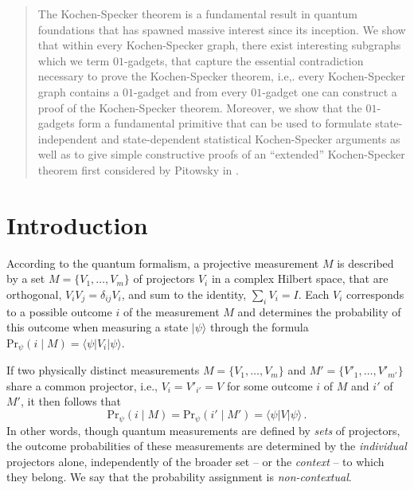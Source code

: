 \documentclass[twocolumn, a4paper, superscriptaddress,nofootinbib, accepted=2020-08-07, hyperref]{quantumarticle}
\begin{document}
\begin{abstract}
	The Kochen-Specker theorem is a fundamental result in quantum foundations that has spawned massive interest since its inception. We show that within every Kochen-Specker graph, there exist interesting subgraphs which we term $01$-gadgets, that capture the essential contradiction necessary to prove the Kochen-Specker theorem, i.e,. every Kochen-Specker graph contains a $01$-gadget and from every $01$-gadget one can construct a proof of the Kochen-Specker theorem. Moreover, we show that the $01$-gadgets form a fundamental primitive that can be used to formulate state-independent and state-dependent statistical Kochen-Specker arguments as well as to give simple constructive proofs of an ``extended'' Kochen-Specker theorem first considered by Pitowsky in \cite{Pitowsky}.  
\end{abstract}

\maketitle


\section{Introduction}
According to the quantum formalism, a projective measurement $M$ is described by a set $M=\{V_1,\ldots,V_m\}$ of projectors $V_i$ in a complex Hilbert space, that are orthogonal, $V_iV_j=\delta_{ij} V_i$, and sum to the identity, $\sum_i V_i=I$. Each $V_i$ corresponds to a possible outcome $i$ of the measurement $M$ and determines the probability of this outcome when measuring a state $|\psi\rangle$ through the formula $\text{Pr}_{\psi}(i\mid M)=\langle\psi|V_i|\psi\rangle$. 

If two physically distinct measurements $M=\{V_1,\ldots,V_m\}$ and $M'=\{V'_1,\ldots,V'_{m'}\}$ share a common projector, i.e., $V_i=V'_{i'}=V$ for some outcome $i$ of $M$ and $i'$ of $M'$, it then follows that
\begin{equation}\label{eq:meas}
\text{Pr}_{\psi}(i\mid M)=\text{Pr}_{\psi}(i'\mid M')=\langle\psi|V|\psi\rangle\,.
\end{equation}
In other words, though quantum measurements are defined by \emph{sets} of projectors, the outcome probabilities of these measurements are determined by the \emph{individual} projectors alone, independently of the broader set -- or the \emph{context} -- to which they belong. We say that the probability assignment is \emph{non-contextual}.
\end{document}
